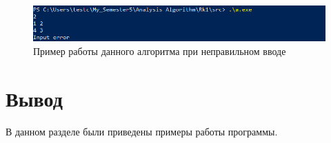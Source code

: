 \begin{figure}[h]
	\begin{center}
		\includegraphics[scale=0.6]{img/example2.png}
	\end{center}
	\captionsetup{justification=centering}
	\caption{Пример работы данного алгоритма при неправильном вводе}
	\label{img:example2}
\end{figure}


\section{Вывод}
В данном разделе были приведены примеры работы программы.